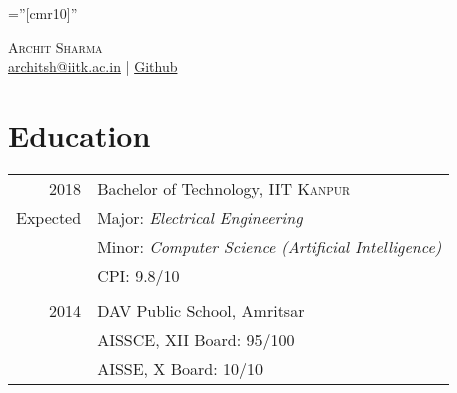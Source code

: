 \documentclass[a4paper,10pt]{article}
\begin{document}

\pagestyle{empty} %

\font\fb=''[cmr10]'' %

\par{\centering
		{\Huge \textsc{Archit Sharma}
	}\\\vspace{1mm} \hspace{-4mm}\href{mailto:architsh@iitk.ac.in}{architsh@iitk.ac.in} | \href{https://github.com/architsharma97/}{Github} \bigskip\par}

\section{Education}
\begin{tabular}{rl}	
\textsc{2018} & \large Bachelor of Technology, \textsc{IIT Kanpur}\\
Expected & {Major}: \textit{Electrical Engineering} \\
         & {Minor}: \textit{Computer Science (Artificial Intelligence)}\\ 
         & {CPI}: \textsc{9.8/10} \\
         & \\
\textsc{2014} & \large DAV Public School, Amritsar\\
              & AISSCE, XII Board: 95/100\\
              & AISSE, X Board: 10/10\\
\end{tabular}
\end{document}
